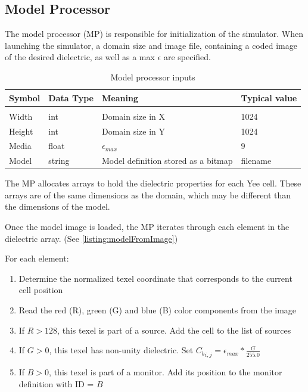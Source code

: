 \subsection{Model Processor}\label{sec:modelProcessor}

The model processor (MP) is responsible for initialization of the simulator. When launching the simulator, a domain size and image file, containing a coded image of the desired dielectric, as well as a max $\epsilon$ are specified.

\begin{table}[h!]
	\centering
	\caption{Model processor inputs}
	\label{tab:modelProcessorInputs}
	\begin{tabular}{l | l | l | l}
		Symbol	& Data Type & Meaning & Typical value				\\
		\hline														\\
		Width	& int 		& Domain size in X & 1024				\\
		Height	& int 		& Domain size in Y & 1024				\\
		Media	& float 	& $\epsilon_{max}$ & 9						\\
		Model	& string	& Model definition stored as a bitmap & filename
	\end{tabular}
\end{table}

The MP allocates arrays to hold the dielectric properties for each Yee cell. These arrays are of the same dimensions as the domain, which may be different than the dimensions of the model. 

Once the model image is loaded, the MP iterates through each element in the dielectric array. (See \autoref{listing:modelFromImage})

For each element:

\begin{enumerate}
	\item Determine the normalized texel coordinate that corresponds to the current cell position	
	\item Read the red (R), green (G) and blue (B) color components from the image
	\item If $R > 128$, this texel is part of a source. Add the cell to the list of sources
	\item If $G > 0$, this texel has non-unity dielectric. Set ${C_b}_{i,j} = \epsilon_{max} * \frac{G}{255.0}$
	\item If $B > 0$, this texel is part of a monitor. Add its position to the monitor definition with ID = $B$
\end{enumerate}

